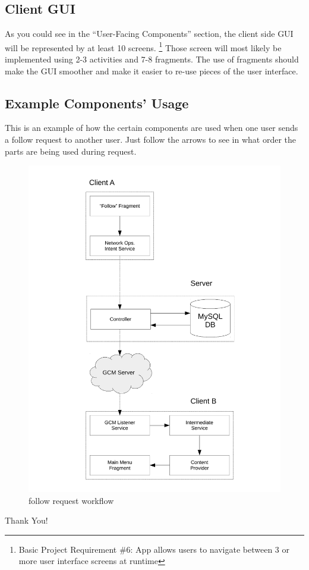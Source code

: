\documentclass{article}
\begin{document}
    \subsection{Client GUI}

    As you could see in the ``User-Facing Components'' section, the client side GUI will be represented by at least 10 screens.
    \footnote{Basic Project Requirement \#6: App allows users to navigate between 3 or more user interface screens at runtime}
    Those screen will most likely be implemented using 2-3 activities and 7-8 fragments. The use of fragments should make the GUI smoother and make it easier to re-use pieces of the user interface.

\newpage

    \subsection{Example Components' Usage}

    This is an example of how the certain components are used when one user sends a follow request to another user. Just follow the arrows to see in what order the parts are being used during request.

    \begin{figure}[ht]
         \centering
         \includegraphics[page=1,width=\textwidth,height=0.7\textheight,keepaspectratio]{follow_req_workflow.pdf}
         \caption{follow request workflow}
         \label{fig:screen_follow_req_workflow}
    \end{figure}

\newpage
{}

\clearpage
\vspace*{\fill}
\begin{center}
    \begin{minipage}{0.4\textwidth}
        \fontsize{28}{12}\selectfont
        Thank You!
    \end{minipage}
\end{center}
\vfill
\clearpage
\end{document}
